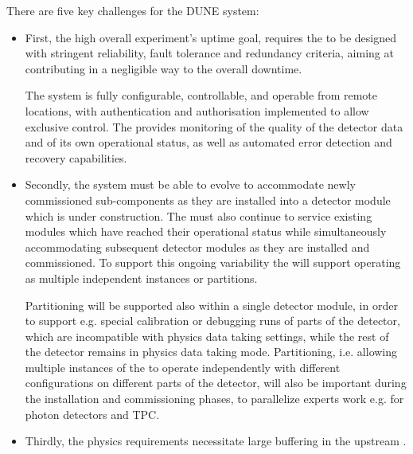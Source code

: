

There are five key challenges for the DUNE   system: 
\begin{itemize}
\item First, the high overall experiment's uptime goal, requires the  to be designed with stringent reliability, fault tolerance and redundancy criteria, aiming at contributing in a negligible way to the overall downtime.

  The  system is fully configurable, controllable, and operable from remote locations, with authentication and authorisation implemented to allow exclusive control. The  provides monitoring of the quality of the detector data and of its own operational status, as well as automated error detection and recovery capabilities.

\item Secondly, the system must be able to evolve to accommodate newly commissioned sub-components as they are installed into a detector module which is under construction. 
  The  must also continue to service existing modules which have reached their operational status while simultaneously accommodating subsequent detector modules as they are installed and commissioned. 
  To support this ongoing variability the  will support operating as multiple independent instances or partitions.

  Partitioning will be supported also within a single detector module, in order to support e.g. special calibration or debugging runs of parts of the detector, which are incompatible with physics data taking settings, while the rest of the detector remains in physics data taking mode. Partitioning, i.e. allowing multiple instances of the  to operate independently with different configurations on different parts of the detector, will also be important during the installation and commissioning phases, to parallelize experts work e.g. for photon detectors and TPC.

\item Thirdly, the  physics requirements necessitate large buffering in the upstream . 


\end{itemize}
